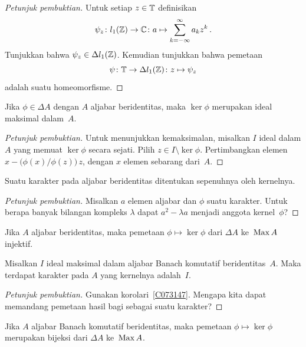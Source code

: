 \begin{proof}[\emph{Petunjuk pembuktian}] Untuk setiap $z \in \mathbb{T}$ definisikan
   \[ \psi_z\colon l_1(\mathbb{Z}) \rightarrow \mathbb{C}\colon a \mapsto \sum_{k=-\infty}^\infty a_kz^k\,. \]
Tunjukkan bahwa $\psi_z \in \Delta l_1(\mathbb{Z})$. Kemudian tunjukkan bahwa pemetaan
   \[ \psi\colon \mathbb{T} \rightarrow \Delta l_1(\mathbb{Z})\colon z \mapsto \psi_z \]
adalah suatu homeomorfisme. \ns
\end{proof}

\begin{prop} Jika $\phi \in \Delta A$ dengan $A$ aljabar beridentitas, maka $\ker\phi$ merupakan
ideal maksimal dalam~$A$.
\end{prop}

\begin{proof}[\emph{Petunjuk pembuktian}] Untuk menunjukkan kemaksimalan, misalkan $I$ ideal dalam $A$
yang memuat $\ker\phi$ secara sejati. Pilih $z \in I \setminus \ker\phi$. Pertimbangkan elemen
$x - \bigl(\phi(x)/\phi(z)\bigr)\,z$, dengan $x$ elemen sebarang dari~$A$.
\ns
\end{proof}

\begin{prop} Suatu karakter pada aljabar beridentitas ditentukan sepenuhnya oleh kernelnya.
\end{prop}

\begin{proof}[\emph{Petunjuk pembuktian}] Misalkan $a$ elemen aljabar dan $\phi$ suatu karakter.
Untuk berapa banyak bilangan kompleks $\lambda$ dapat $a^2 - \lambda a$ menjadi anggota kernel~$\phi$? \ns
\end{proof}

\begin{cor} Jika $A$ aljabar beridentitas, maka pemetaan $\phi \mapsto \ker\phi$ dari
$\Delta A$ ke~$\operatorname{Max} A$ injektif.
\end{cor}

\begin{prop}\label{0007207} Misalkan $I$ ideal maksimal dalam aljabar Banach komutatif beridentitas~$A$.
Maka terdapat karakter pada $A$ yang kernelnya adalah~$I$.
\end{prop}

\begin{proof}[\emph{Petunjuk pembuktian}] Gunakan korolari~\ref{C073147}. Mengapa kita dapat memandang
pemetaan hasil bagi sebagai suatu karakter?  \ns
\end{proof}

\begin{cor}\label{0007207a} Jika $A$ aljabar Banach komutatif beridentitas, maka pemetaan
$\phi \mapsto \ker\phi$ merupakan bijeksi dari $\Delta A$ ke~$\operatorname{Max} A$.
\end{cor}


